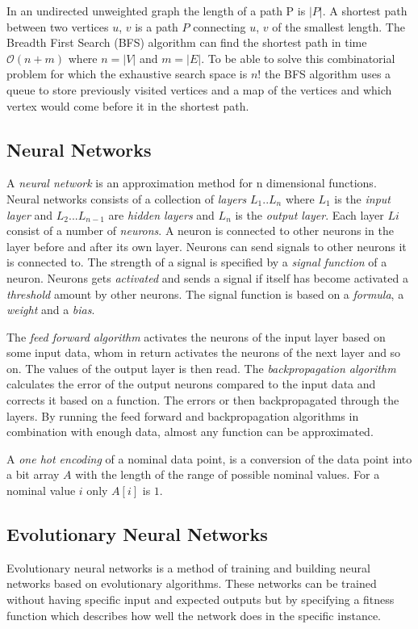 \documentclass{article}
\begin{document}
In an undirected unweighted graph the length of a path P is $ |P| $. A shortest path between two vertices  $ u $, $ v $ is a path $ P $ connecting  $ u $, $ v $ of the smallest length. The Breadth First Search (BFS) algorithm can find the shortest path in time $ \mathcal{O}(n+m) $ where $ n=|V| $ and $ m=|E| $. To be able to solve this combinatorial problem for which the exhaustive search space is $ n! $ the BFS algorithm uses a queue to store previously visited vertices and a map of the vertices and which vertex would come before it in the shortest path.


\subsection{Neural Networks}
A \textit{neural network} is an approximation method for n dimensional functions. Neural networks consists of a collection of \textit{layers} $ L_1 .. L_n $ where $ L_1 $ is the \textit{input layer} and $ L_2 ... L_{n-1} $ are \textit{hidden layers} and $ L_n $ is the \textit{output layer}. Each layer $ Li $ consist of a number of \textit{neurons}. A neuron is connected to other neurons in the layer before and after its own layer. Neurons can send signals to other neurons it is connected to. The strength of a signal is specified by a \textit{signal function} of a neuron. Neurons gets \textit{activated} and sends a signal if itself has become activated a \textit{threshold} amount by other neurons. The signal function is based on a \textit{formula}, a \textit{weight} and a \textit{bias}. 

The \textit{feed forward algorithm} activates the neurons of the input layer based on some input data, whom in return activates the neurons of the next layer and so on. The values of the output layer is then read. The \textit{backpropagation algorithm} calculates the error of the output neurons compared to the input data and corrects it based on a function. The errors or then backpropagated through the layers. By running the feed forward and backpropagation algorithms in combination with enough data, almost any function can be approximated.

A \textit{one hot encoding} of a nominal data point, is a conversion of the data point into a bit array $ A $ with the length of the range of possible nominal values. For a nominal value $ i $ only $ A[i] $ is $ 1 $.  

\subsection{Evolutionary Neural Networks}
Evolutionary neural networks is a method of training and building neural networks based on evolutionary algorithms. These networks can be trained without having specific input and expected outputs but by specifying a fitness function which describes how well the network does in the specific instance. 
\end{document}
